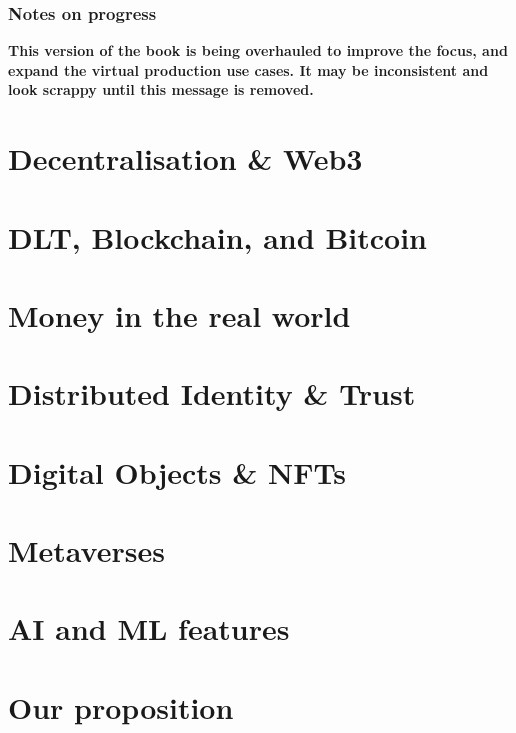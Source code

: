 \documentclass[
	10pt, %
	fleqn, %
	a5paper, %
]{LegrandOrangeBook}
\begin{document}
\subsection{Notes on progress}
\textbf{This version of the book is being overhauled to improve the focus, and expand the virtual production use cases. It may be inconsistent and look scrappy until this message is removed.}

\chapter{Decentralisation \& Web3}


\chapter{DLT, Blockchain, and Bitcoin}

\chapter{Money in the real world}


%

\chapter{Distributed Identity \& Trust}


\chapter{Digital Objects \& NFTs}


\chapter{Metaverses}


\chapter{AI and ML features}


\chapter{Our proposition}

\end{document}
